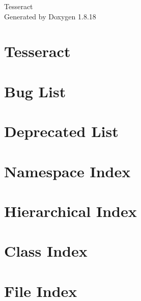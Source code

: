 \let\mypdfximage\pdfximage\def\pdfximage{\immediate\mypdfximage}\documentclass[twoside]{book}
\newcommand{\+}{\discretionary{\mbox{\scriptsize$\hookleftarrow$}}{}{}}
\newcommand{\clearemptydoublepage}{%
  \newpage{\pagestyle{empty}\cleardoublepage}%
}
\begin{document}
\hypersetup{pageanchor=false,
             bookmarksnumbered=true,
             pdfencoding=unicode
            }
\begin{titlepage}
\vspace*{7cm}
\begin{center}%
{\Large Tesseract }\\
\vspace*{1cm}
{\large Generated by Doxygen 1.8.18}\\
\end{center}
\end{titlepage}
\clearemptydoublepage
{}
\tableofcontents
\clearemptydoublepage
{}
\hypersetup{pageanchor=true}

\chapter{Tesseract}
\label{index}\hypertarget{index}{}
\chapter{Bug List}
\label{bug}

\chapter{Deprecated List}
\label{deprecated}

\chapter{Namespace Index}

\chapter{Hierarchical Index}

\chapter{Class Index}

\chapter{File Index}

\end{document}
